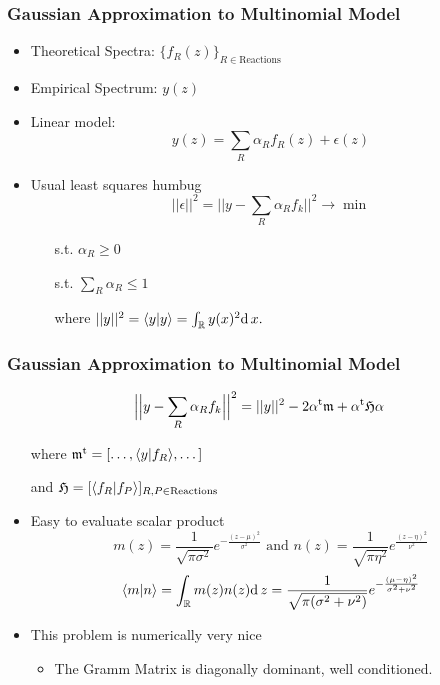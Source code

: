 \documentclass[xetex]{beamer}
\begin{document}
	\begin{frame}\frametitle{Gaussian Approximation to Multinomial Model}

		\begin{itemize}
			\item Theoretical Spectra: $\Big\{ f_R(z) \Big\}_{R \in \text{Reactions}}$
			\item Empirical Spectrum: $y(z)$
			\item Linear model:
			$$ y(z) = \sum_{R} \alpha_R f_R (z) + \epsilon(z)$$
			\item Usual least squares humbug
			$$ ||\epsilon||^2 = \Big|\Big| y - \sum_{R} \alpha_R f_k \Big|\Big|^2 \rightarrow \min$$
			\begin{itemize}
				\item[s.t.] $\alpha_R \geq 0$
				\item[s.t.] $\sum_R \alpha_R \leq 1$
				\item[where] $ ||y||^2 = \langle y|y \rangle =  \int_{\mathbb{R}} y(x)^2 \mathrm{d}\,x.$ 
			\end{itemize}
		\end{itemize}
	\end{frame}

	\begin{frame}\frametitle{Gaussian Approximation to Multinomial Model}

		$$ \Big|\Big| y - \sum_{R} \alpha_R f_k \Big|\Big|^2 = || y ||^2 - 2 \alpha^{\mathrm{t}} \mathfrak{m} + \alpha^{\mathrm{t}} \mathfrak{H} \alpha$$ 

		\begin{itemize}
			\item[where] $\mathfrak{m}^{\mathrm{t}} = [ \dots, \langle y|f_R \rangle, \dots ]$
			\item[and] $\mathfrak{H} = [\langle f_R|f_P \rangle]_{R,P \in \text{Reactions}}$
			\item[] 			
			\item Easy to evaluate scalar product 
			$$ m(z) = \frac{1}{\sqrt{\pi \sigma^2}} e^{-\frac{(z-\mu)^2}{\sigma^2}}\text{ and } 
n(z) = \frac{1}{\sqrt{\pi \eta^2}} e^{\frac{(z-\eta)^2}{\nu^2}}
$$
			$$\langle m|n \rangle = \int_{\mathbb{R}} m(z)n(z) \mathrm{d}\,z  = \frac{1}{\sqrt{\pi (\sigma^2 + \nu^2)}}e^{-\frac{(\mu-\eta)^2}{\sigma^2+\nu^2}}$$  
			\item This problem is numerically very nice
			\begin{itemize}
				\item The Gramm Matrix is diagonally dominant, well conditioned. 
			\end{itemize}
		\end{itemize}

	\end{frame}
\end{document}

